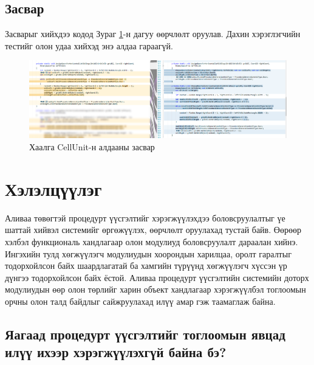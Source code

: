 \subsection{Засвар}
Засварыг хийхдээ кодод Зураг \ref{fig:fix}-н дагуу өөрчлөлт оруулав. Дахин хэрэглэгчийн тестийг олон удаа хийхэд энэ алдаа гараагүй.
\begin{figure}[t]
	\centering
	\includegraphics[width=\textwidth]{./images/fix.png}
	\caption{Хаалга CellUnit-н алдааны засвар}
	\label{fig:fix}
\end{figure}

\section{Хэлэлцүүлэг}
Аливаа төвөгтэй процедурт үүсгэлтийг хэрэгжүүлэхдээ боловсруулалтыг үе шаттай хийвэл системийг өргөжүүлэх, өөрчлөлт оруулахад тустай байв. Өөрөөр хэлбэл функциональ хандлагаар олон модулиуд боловсруулалт дараалан хийнэ. Ингэхийн тулд хөгжүүлэгч модулиудын хоорондын харилцаа, оролт гаралтыг тодорхойлсон байх шаардлагатай ба хамгийн түрүүнд хөгжүүлэгч хүссэн үр дүнгээ тодорхойлсон байх ёстой. Аливаа процедурт үүсгэлтийн системийн доторх модулиудын өөр олон төрлийг харин объект хандлагаар хэрэгжүүлбэл тоглоомын орчны олон талд байдлыг сайжруулахад илүү амар гэж таамаглаж байна.
\subsection{Яагаад процедурт үүсгэлтийг тоглоомын явцад илүү ихээр хэрэгжүүлэхгүй байна бэ?}

